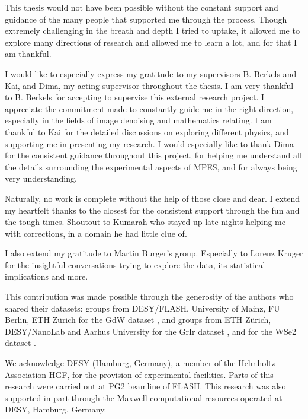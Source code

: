 This thesis would not have been possible without the constant support and guidance of the many people that supported me through the process. Though extremely challenging in the breath and depth I tried to uptake, it allowed me to explore many directions of research and allowed me to learn a lot, and for that I am thankful.

I would like to especially express my gratitude to my supervisors B. Berkels and Kai, and Dima, my acting supervisor throughout the thesis. I am very thankful to B. Berkels for accepting to supervise this external research project. I appreciate the commitment made to constantly guide me in the right direction, especially in the fields of image denoising and mathematics relating. I am thankful to Kai for the detailed discussions on exploring different physics, and supporting me in presenting my research. I would especially like to thank Dima for the consistent guidance throughout this project, for helping me understand all the details surrounding the experimental aspects of MPES, and for always being very understanding.

Naturally, no work is complete without the help of those close and dear. I extend my heartfelt thanks to the closest for the consistent support through the fun and the tough times. Shoutout to Kumarah who stayed up late nights helping me with corrections, in a domain he had little clue of.

I also extend my gratitude to Martin Burger's group. Especially to Lorenz Kruger for the insightful conversations trying to explore the data, its statistical implications and more.

This contribution was made possible through the generosity of the authors who shared their datasets: groups from DESY/FLASH, University of Mainz, FU Berlin, ETH Zürich for the \gls{GdW} dataset \cite{kutnyakhovMultidimensionalPhotoemissionSpectra2024}, \citeauthor{heberMultispectralTimeresolvedEnergy2022} and groups from ETH Zürich, DESY/NanoLab and Aarhus University for the \gls{GrIr} dataset \cite{heberMultispectralTimeresolvedEnergy2022}, and \citeauthor{maklarTimeresolvedARPESRAW2022} for the \gls{WSe2} dataset \cite{maklarTimeresolvedARPESRAW2022}.

We acknowledge DESY (Hamburg, Germany), a member of the Helmholtz Association HGF, for the provision of experimental facilities. Parts of this research were carried out at PG2 beamline of FLASH. This research was also supported in part through the Maxwell computational resources operated at DESY, Hamburg, Germany.

